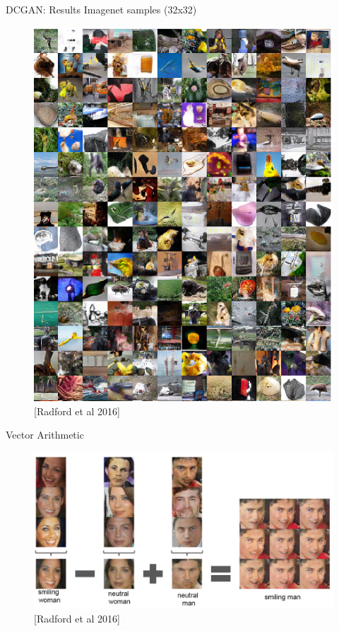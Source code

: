 \begin{frame}[allowframebreaks]{DCGAN: Results}
    Imagenet samples (32x32)
    \begin{figure}
        \centering
        \includegraphics[height=0.8\textheight,keepaspectratio]{images/gan/dcgan-result-4.png}
        \caption*{[Radford et al 2016]}
    \end{figure}

    \framebreak

    Vector Arithmetic
    \begin{figure}
        \centering
        \includegraphics[height=0.75\textheight,keepaspectratio]{images/gan/dcgan-result-5.png}
        \caption*{[Radford et al 2016]}
    \end{figure}


\end{frame}
